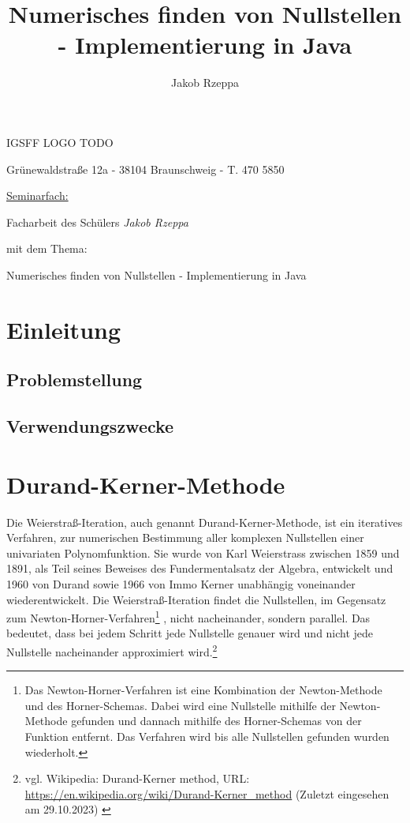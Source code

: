 \documentclass[12pt]{article}
\title{Numerisches finden von Nullstellen - Implementierung in Java}
\author{Jakob Rzeppa}
\begin{document}
\begin{titlepage}
	\centering
    {\huge IGSFF LOGO TODO\par}
	{Grünewaldstraße 12a - 38104 Braunschweig - T. 470 5850\par}
	\vspace{1cm}
	{\underline{Seminarfach:}\par}
	\vspace{1cm}
    {\large Facharbeit des Schülers \textit{Jakob Rzeppa} \par mit dem Thema: \par}
    \vspace{1.5cm}
	{\huge Numerisches finden von Nullstellen - Implementierung in Java\par}
	\vspace{2cm}
\end{titlepage}

\tableofcontents

\section{Einleitung}

\subsection{Problemstellung}

\subsection{Verwendungszwecke}

\section{Durand-Kerner-Methode}
Die Weierstraß-Iteration, auch genannt Durand-Kerner-Methode, ist ein iteratives Verfahren, zur numerischen Bestimmung aller komplexen Nullstellen einer univariaten Polynomfunktion.
Sie wurde von Karl Weierstrass zwischen 1859 und 1891, als Teil seines Beweises des Fundermentalsatz der Algebra, entwickelt und 1960 von Durand sowie 1966 von Immo Kerner unabhängig voneinander wiederentwickelt.
Die Weierstraß-Iteration findet die Nullstellen, im Gegensatz zum Newton-Horner-Verfahren\footnote{
    Das Newton-Horner-Verfahren ist eine Kombination der Newton-Methode und des Horner-Schemas. Dabei wird eine Nullstelle mithilfe der Newton-Methode gefunden und dannach mithilfe des Horner-Schemas von der Funktion entfernt. Das Verfahren wird bis alle Nullstellen gefunden wurden wiederholt.
}
, nicht nacheinander, sondern parallel. Das bedeutet, dass bei jedem Schritt jede Nullstelle genauer wird und nicht jede Nullstelle nacheinander approximiert wird.\footnote{
    vgl. Wikipedia: Durand-Kerner method, URL: \url{https://en.wikipedia.org/wiki/Durand-Kerner_method} (Zuletzt eingesehen am 29.10.2023)
    \label{ftn:Wikipedia-Durand-Kerner-Method}
}
\end{document}
